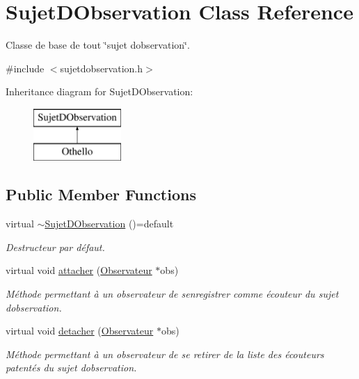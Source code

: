 \hypertarget{class_sujet_d_observation}{}\section{Sujet\+D\+Observation Class Reference}
\label{class_sujet_d_observation}


Classe de base de tout \char`\"{}sujet d\textquotesingle{}observation\char`\"{}.  




{\ttfamily \#include $<$sujetdobservation.\+h$>$}

Inheritance diagram for Sujet\+D\+Observation\+:\begin{figure}[H]
\begin{center}
\leavevmode
\includegraphics[height=2.000000cm]{class_sujet_d_observation}
\end{center}
\end{figure}
\subsection*{Public Member Functions}
\begin{DoxyCompactItemize}
\item 
\hypertarget{class_sujet_d_observation_a7dea5b7feaec2bb1b33014e449acddac}{}virtual \hyperlink{class_sujet_d_observation_a7dea5b7feaec2bb1b33014e449acddac}{$\sim$\+Sujet\+D\+Observation} ()=default\label{class_sujet_d_observation_a7dea5b7feaec2bb1b33014e449acddac}

\begin{DoxyCompactList}\small\item\em Destructeur par défaut. \end{DoxyCompactList}\item 
virtual void \hyperlink{class_sujet_d_observation_a697269174b77f64d270e839ab5557a1e}{attacher} (\hyperlink{class_observateur}{Observateur} $\ast$obs)
\begin{DoxyCompactList}\small\item\em Méthode permettant à un observateur de s\textquotesingle{}enregistrer comme écouteur du sujet d\textquotesingle{}observation. \end{DoxyCompactList}\item 
virtual void \hyperlink{class_sujet_d_observation_a05e8d7285a4f1c79d9f53e274653ea1b}{detacher} (\hyperlink{class_observateur}{Observateur} $\ast$obs)
\begin{DoxyCompactList}\small\item\em Méthode permettant à un observateur de se retirer de la liste des écouteurs patentés du sujet d\textquotesingle{}observation. \end{DoxyCompactList}\end{DoxyCompactItemize}
